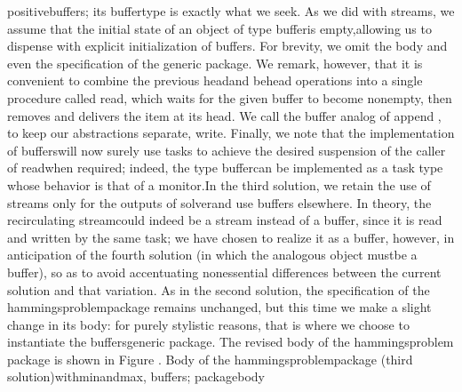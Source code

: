 \tyxffmxmono[]positive\Symuns[]buffers\tyxffmxendmono[]; its %
\tyxffmxmono[]buffer\tyxffmxendmono[] type is exactly what we seek.
 As we did with streams, we assume that the initial state of an object
of type \tyxffmxmono[]buffer\tyxffmxendmono[] is \ldquo[]empty,\rdquo[]
allowing us to dispense with explicit initialization of buffers. For
brevity, we omit the body and even the specification of the generic
package. We remark, however, that it is convenient to combine the
previous \tyxffmxmono[]head\tyxffmxendmono[] and \tyxffmxmono[]behead%
\tyxffmxendmono[] operations into a single procedure called %
\tyxffmxmono[]read\tyxffmxendmono[], which waits for the given buffer
to become nonempty, then removes and delivers the item at its head.
We call the buffer analog of \tyxffmxmono[]append%
\tyxffmxendmono[], to keep our abstractions separate, %
\tyxffmxmono[]write\tyxffmxendmono[]. Finally, we note that the implementation
of \tyxffmxmono[]buffers\tyxffmxendmono[] will now surely use tasks
to achieve the desired suspension of the caller of %
\tyxffmxmono[]read\tyxffmxendmono[] when required; indeed, the type
\tyxffmxmono[]buffer\tyxffmxendmono[] can be implemented as a task
type whose behavior is that of a monitor.\Endpara[]
\Para[]In the third solution, we retain the use of streams only for
the outputs of \tyxffmxmono[]solver\tyxffmxendmono[] and use buffers
elsewhere. In theory, the recirculating \ldquo[]stream\rdquo[] could
indeed be a stream instead of a buffer, since it is read and written
by the same task; we have chosen to realize it as a buffer, however,
in anticipation of the fourth solution (in which the analogous object
\txtxemph[]must\txtxendemph[] be a buffer), so as to avoid accentuating
nonessential differences between the current solution and that variation.
As in the second solution, the specification of the %
\tyxffmxmono[]hammings\Symuns[]problem\tyxffmxendmono[] package remains
unchanged, but this time we make a slight change in its body: for
purely stylistic reasons, that is where we choose to instantiate the
\tyxffmxmono[]buffers\tyxffmxendmono[] generic package. The revised
body of the \tyxffmxmono[]hammings\Symuns[]problem%
\tyxffmxendmono[] package is shown in Figure .
\Parbox[]
Body of the %
\tyxffmxmono[]hammings\Symuns[]problem\tyxffmxendmono[] package (third
solution)\FgEndcap[]
\Comp[]\tyxtstxbf[]with\tyxtstxendbf[] min\Symuns[]and\Symuns[]max, buffers;
\tyxtstxbf[]package\tyxtstxendbf[] \tyxtstxbf[]body%
